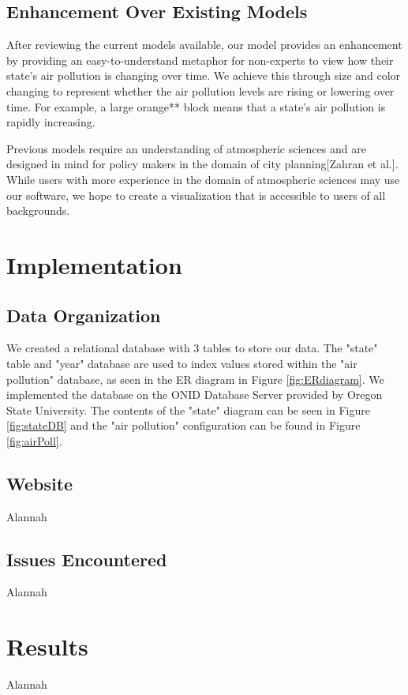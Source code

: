 \documentclass[journal]{vgtc}                %
\begin{document}
\subsection{Enhancement Over Existing Models}

After reviewing the current models available, our model provides an enhancement by providing an easy-to-understand
metaphor for non-experts to view how their state's air pollution is changing over time. We achieve this through size
and color changing to represent whether the air pollution levels are rising or lowering over time. For example, a large
orange** block means that a state's air pollution is rapidly increasing.

Previous models require an understanding of atmospheric sciences and are designed in mind for policy makers in the domain
of city planning[Zahran et al.]. While users with more experience in the domain of atmospheric sciences may use our
software, we hope to create a visualization that is accessible to users of all backgrounds.

\section{Implementation}

\subsection{Data Organization}
We created a relational database with 3 tables to store our data. The "state" table and "year" database are used to
index values stored within the "air pollution" database, as seen in the ER diagram in Figure \ref{fig:ERdiagram}.
We implemented the database on the ONID Database Server provided by Oregon State University. The contents
of the "state" diagram can be seen in Figure \ref{fig:stateDB} and the "air pollution" configuration can be found in 
Figure \ref{fig:airPoll}.

\subsection{Website}
Alannah

\subsection{Issues Encountered}
Alannah

\section{Results}
Alannah
\end{document}
